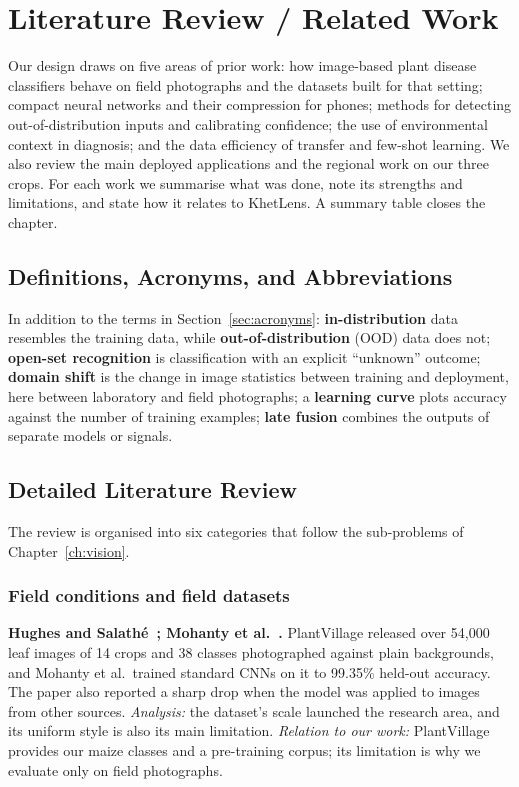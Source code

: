 \chapter{Literature Review / Related Work}
\label{ch:lit}

Our design draws on five areas of prior work: how image-based plant disease classifiers behave on field photographs and the datasets built for that setting; compact neural networks and their compression for phones; methods for detecting out-of-distribution inputs and calibrating confidence; the use of environmental context in diagnosis; and the data efficiency of transfer and few-shot learning. We also review the main deployed applications and the regional work on our three crops. For each work we summarise what was done, note its strengths and limitations, and state how it relates to KhetLens. A summary table closes the chapter.

\section{Definitions, Acronyms, and Abbreviations}
In addition to the terms in Section~\ref{sec:acronyms}: \textbf{in-distribution} data resembles the training data, while \textbf{out-of-distribution} (OOD) data does not; \textbf{open-set recognition} is classification with an explicit ``unknown'' outcome; \textbf{domain shift} is the change in image statistics between training and deployment, here between laboratory and field photographs; a \textbf{learning curve} plots accuracy against the number of training examples; \textbf{late fusion} combines the outputs of separate models or signals.

\section{Detailed Literature Review}
The review is organised into six categories that follow the sub-problems of Chapter~\ref{ch:vision}.

\subsection{Field conditions and field datasets}
\label{sec:lit-gap}
\textbf{Hughes and Salath\'e~\cite{hughes2015plantvillage}; Mohanty et al.~\cite{mohanty2016}.} PlantVillage released over 54,000 leaf images of 14 crops and 38 classes photographed against plain backgrounds, and Mohanty et al.\ trained standard CNNs on it to 99.35\% held-out accuracy. The paper also reported a sharp drop when the model was applied to images from other sources. \emph{Analysis:} the dataset's scale launched the research area, and its uniform style is also its main limitation. \emph{Relation to our work:} PlantVillage provides our maize classes and a pre-training corpus; its limitation is why we evaluate only on field photographs.

